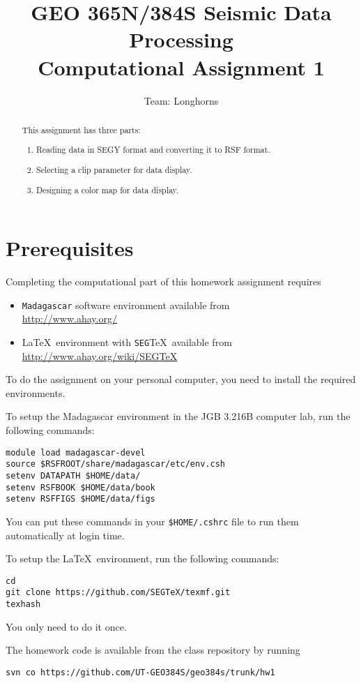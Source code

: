 \author{Team: Longhorns}
\title{GEO 365N/384S Seismic Data Processing \\ Computational Assignment 1}

\begin{abstract}
  This assignment has three parts:
  \begin{enumerate}
  \item Reading data in SEGY format and converting it to RSF format. 
  \item Selecting a clip parameter for data display.
  \item Designing a color map for data display.
  \end{enumerate}
\end{abstract}

\section{Prerequisites}

Completing the computational part of this homework assignment requires
\begin{itemize}
\item \texttt{Madagascar} software environment available from \\
\url{http://www.ahay.org/}
\item \LaTeX\ environment with \texttt{SEG}\TeX\ available from \\ 
\url{http://www.ahay.org/wiki/SEGTeX}
\end{itemize}
To do the assignment on your personal computer, you need to install
the required environments. 

To setup the Madagascar environment in the JGB 3.216B computer lab, run the following commands:
\begin{verbatim}
module load madagascar-devel
source $RSFROOT/share/madagascar/etc/env.csh
setenv DATAPATH $HOME/data/
setenv RSFBOOK $HOME/data/book
setenv RSFFIGS $HOME/data/figs
\end{verbatim}
You can put these commands in your \verb+$HOME/.cshrc+ file to run them automatically at login time.

To setup the \LaTeX\ environment, run the following commands:
\begin{verbatim}
cd
git clone https://github.com/SEGTeX/texmf.git
texhash
\end{verbatim}
You only need to do it once.

The homework code is available from the class repository
by running
\begin{verbatim}
svn co https://github.com/UT-GEO384S/geo384s/trunk/hw1
\end{verbatim}

